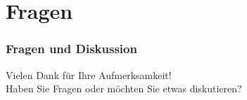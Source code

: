 \section{Fragen}
\begin{frame}
  \frametitle{Fragen und Diskussion}
  Vielen Dank für Ihre Aufmerksamkeit! \\
  Haben Sie Fragen oder möchten Sie etwas diskutieren?
\end{frame}